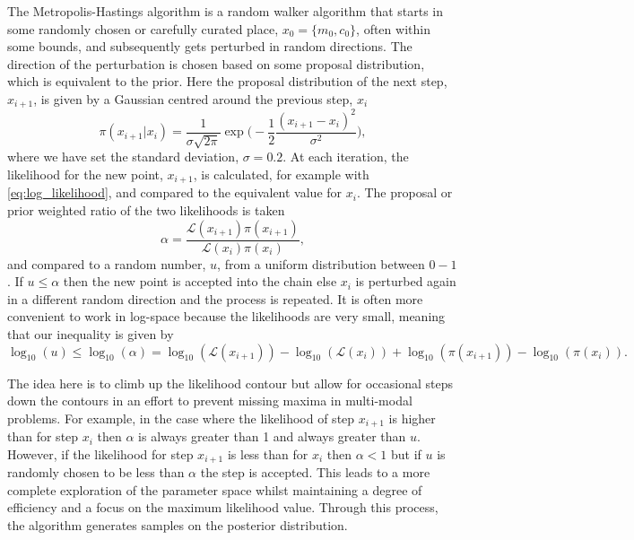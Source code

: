 The Metropolis-Hastings algorithm is a random walker algorithm that starts in some randomly chosen or carefully curated place, $x_0 = \{m_0, c_0\}$, often within some bounds, and subsequently gets perturbed in random directions. The direction of the perturbation is chosen based on some proposal distribution, which is equivalent to the prior. Here the proposal distribution of the next step, $x_{i+1}$, is given by a Gaussian centred around the previous step, $x_{i}$
\begin{equation}
    \pi(x_{i+1}|x_{i}) = \frac{1}{\sigma \sqrt{2\pi}}\exp\bigg(-\frac{1}{2}\frac{(x_{i+1} - x_{i})^2}{\sigma^2}\bigg),
\end{equation}
where we have set the standard deviation, $\sigma = 0.2$. At each iteration, the likelihood for the new point, $x_{i+1}$, is calculated, for example with \cref{eq:log_likelihood}, and compared to the equivalent value for $x_{i}$. The proposal or prior weighted ratio of the two likelihoods is taken
\begin{equation}
    \alpha = \frac{\mathcal{L}(x_{i+1}) \pi(x_{i+1})}{\mathcal{L}(x_{i})\pi(x_{i})},
\end{equation}
and compared to a random number, $u$, from a uniform distribution between $0 - 1$. If $u \leq \alpha$ then the new point is accepted into the chain else $x_{i}$ is perturbed again in a different random direction and the process is repeated. It is often more convenient to work in log-space because the likelihoods are very small, meaning that our inequality is given by
\begin{equation}
    \log_{10}(u) \leq \log_{10}(\alpha) = \log_{10}(\mathcal{L}(x_{i+1})) - \log_{10}(\mathcal{L}(x_{i})) + \log_{10}(\pi(x_{i+1})) - \log_{10}(\pi(x_{i})).
\end{equation}

The idea here is to climb up the likelihood contour but allow for occasional steps down the contours in an effort to prevent missing maxima in multi-modal problems. For example, in the case where the likelihood of step $x_{i+1}$ is higher than for step $x_{i}$ then $\alpha$ is always greater than 1 and always greater than $u$. However, if the likelihood for step $x_{i+1}$ is less than for $x_{i}$ then $\alpha < 1$ but if $u$ is randomly chosen to be less than $\alpha$ the step is accepted. This leads to a more complete exploration of the parameter space whilst maintaining a degree of efficiency and a focus on the maximum likelihood value. Through this process, the algorithm generates samples on the posterior distribution.

